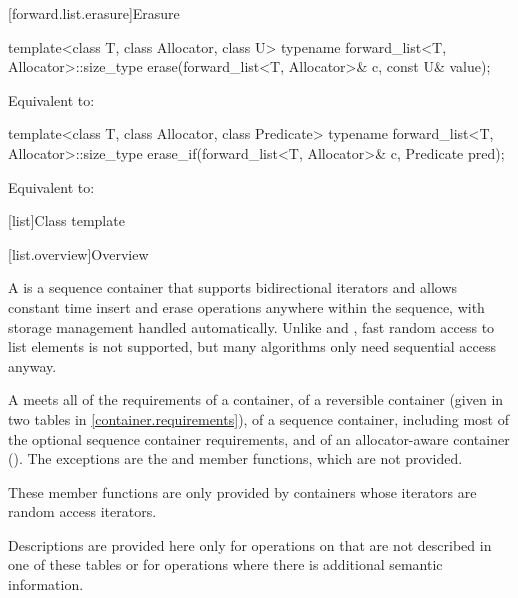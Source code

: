 [forward.list.erasure]{Erasure}

%
\begin{itemdecl}
template<class T, class Allocator, class U>
  typename forward_list<T, Allocator>::size_type
    erase(forward_list<T, Allocator>& c, const U& value);
\end{itemdecl}

\begin{itemdescr}
\pnum
\effects
Equivalent to: 
\end{itemdescr}

%
\begin{itemdecl}
template<class T, class Allocator, class Predicate>
  typename forward_list<T, Allocator>::size_type
    erase_if(forward_list<T, Allocator>& c, Predicate pred);
\end{itemdecl}

\begin{itemdescr}
\pnum
\effects
Equivalent to: 
\end{itemdescr}

[list]{Class template }

[list.overview]{Overview}

\pnum
{}%
A
is a sequence container that supports
bidirectional iterators and allows constant time insert and erase
operations anywhere within the sequence, with storage management handled
automatically. Unlike  and ,
fast random access to list elements is not supported, but many
algorithms only need sequential access anyway.

\pnum
A  meets all of the requirements of a container, of
a reversible container (given in two tables in
\ref{container.requirements}), of a sequence container,
including most of the optional sequence container
requirements, and of an allocator-aware container
().
The exceptions are the
and
member functions, which are not provided.
\begin{footnote}
These member functions
are only provided by containers whose iterators
are random access iterators.
\end{footnote}
Descriptions are provided here only for operations on
that are not described in one of these tables
or for operations where there is additional semantic information.


